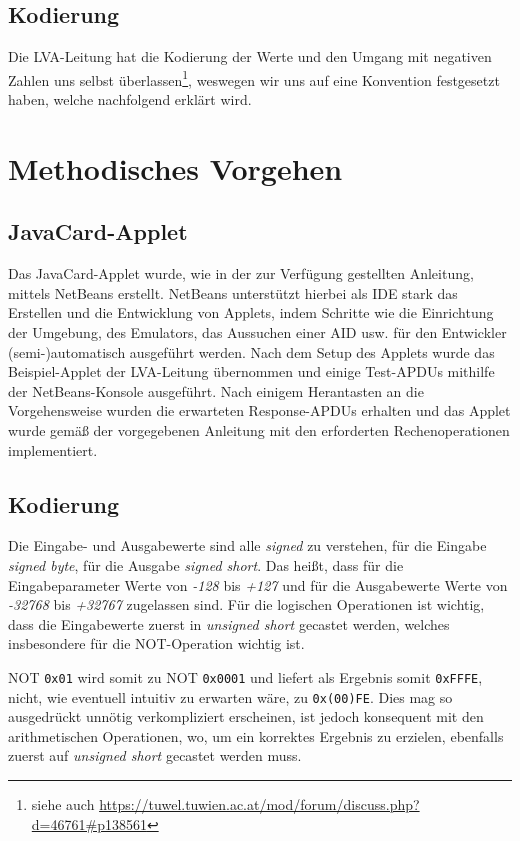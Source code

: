 \documentclass[paper=a4, fontsize=11pt]{scrartcl}
\begin{document}
\subsection{Kodierung}
Die LVA-Leitung hat die Kodierung der Werte und den Umgang mit negativen Zahlen uns selbst überlassen\footnote{siehe auch \url{https://tuwel.tuwien.ac.at/mod/forum/discuss.php?d=46761\#p138561}}, weswegen wir uns auf eine Konvention festgesetzt haben, welche nachfolgend erklärt wird.


\section{Methodisches Vorgehen}
\subsection{JavaCard-Applet}
Das JavaCard-Applet wurde, wie in der zur Verfügung gestellten Anleitung, mittels NetBeans erstellt. NetBeans unterstützt hierbei als IDE stark das Erstellen und die Entwicklung von Applets, indem Schritte wie die Einrichtung der Umgebung, des Emulators, das Aussuchen einer AID usw. für den Entwickler (semi-)automatisch ausgeführt werden.
Nach dem Setup des Applets wurde das Beispiel-Applet der LVA-Leitung übernommen und einige Test-APDUs mithilfe der NetBeans-Konsole ausgeführt. Nach einigem Herantasten an die Vorgehensweise wurden die erwarteten Response-APDUs erhalten und das Applet wurde gemäß der vorgegebenen Anleitung mit den erforderten Rechenoperationen implementiert.

\subsection{Kodierung}
Die Eingabe- und Ausgabewerte sind alle \textit{signed} zu verstehen, für die Eingabe \textit{signed byte}, für die Ausgabe \textit{signed short}. Das heißt, dass für die Eingabeparameter Werte von \textit{-128} bis \textit{+127} und für die Ausgabewerte Werte von \textit{-32768} bis \textit{+32767} zugelassen sind. Für die logischen Operationen ist wichtig, dass die Eingabewerte zuerst in \textit{unsigned short} gecastet werden, welches insbesondere für die NOT-Operation wichtig ist.

NOT \texttt{0x01} wird somit zu NOT \texttt{0x0001} und liefert als Ergebnis somit \texttt{0xFFFE}, nicht, wie eventuell intuitiv zu erwarten wäre, zu \texttt{0x(00)FE}. Dies mag so ausgedrückt unnötig verkompliziert erscheinen, ist jedoch konsequent mit den arithmetischen Operationen, wo, um ein korrektes Ergebnis zu erzielen, ebenfalls zuerst auf \textit{unsigned short} gecastet werden muss.
\end{document}
